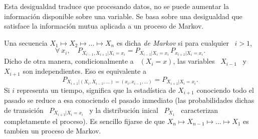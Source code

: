 
\label{Ssec:SZ:ProcDatos}

Esta  desigualdad  traduce  que  procesando  datos,  no  se  puede  aumentar  la
informaci\'on disponible sobre  una variable. Se basa sobre  una desigualdad que
satisface la informaci\'on mutua aplicada a un proceso de Markov.

\begin{definicion}
\label{Def:SZ:ProcesoMarkov}
%
  Una secuencia  $X_1 \mapsto X_2 \mapsto  \ldots \mapsto X_n$ es  dicha {\it de
    Markov}   si   para  cualquier \   $i   >   1$,
  \[
  \forall \: x_i, \quad P_{X_{i-1},X_{i+1}|X_i=x_i} = P_{X_{i-1}|X_i=x_i} \, P_{x_{i+1}|X_i=x_i}.
  \]
  Dicho  de  otra  manera,  condicionalmente  a \  $(X_i=x)$,  las  variables  \
  $X_{i-1}$ \ y \ $X_{i+1}$ son independientes.  Eso es equivalente a
  \[
  P_{X_{i+1}|(X_i,X_{i-1},\ldots)=(x_i,x_{i-1},\ldots)} = P_{X_{i+1}|X_i=x_i}.
  \]
  Si  $i$ representa  un tiempo,  significa  que la  estad\'istica de  $X_{i+1}$
  conociendo todo el pasado se reduce  a esa conociendo el pasado inmediato (las
  probabilidades  dichas   de  transici\'on  \  $P_{X_{i+1}|X_i=x_i}$   \  y  la
  distribuci\'on inical  \ $P_{X_1}$  \ caracterizan completamente  el proceso).
  Es sencillo fijarse de que $X_n \mapsto X_{n-1} \mapsto \ldots \mapsto X_1$ es
  tambien un proceso de Markov.
\end{definicion}


